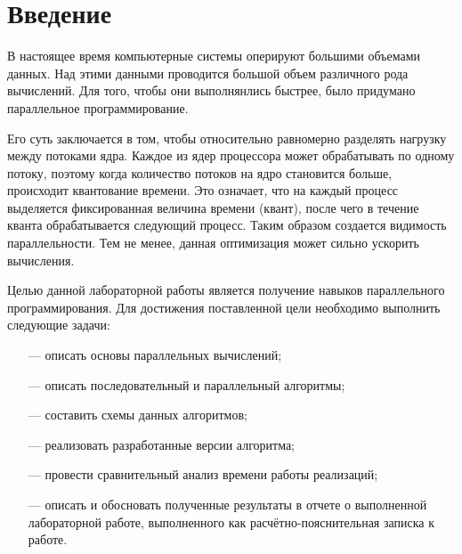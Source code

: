 \chapter*{Введение}

В настоящее время компьютерные системы оперируют большими объемами данных. Над этими данными проводится большой объем различного рода вычислений. Для того, чтобы они выполнянлись быстрее, было придумано параллельное программирование.

Его суть заключается в том, чтобы относительно равномерно разделять нагрузку между потоками ядра. Каждое из ядер процессора может обрабатывать по одному потоку, поэтому когда количество потоков на ядро становится больше, происходит квантование времени. Это означает, что на каждый процесс выделяется фиксированная величина времени (квант), после чего в течение кванта обрабатывается следующий процесс. Таким образом создается видимость параллельности. Тем не менее, данная оптимизация может сильно ускорить вычисления. 

Целью данной лабораторной работы является получение навыков параллельного программирования. Для достижения поставленной цели необходимо выполнить следующие задачи:

\begin{itemize}
	\item[---] описать основы параллельных вычислений;
	\item[---] описать последовательный и параллельный алгоритмы;
	\item[---] составить схемы данных алгоритмов;
    \item[---] реализовать разработанные версии алгоритма;
	\item[---] провести сравнительный анализ времени работы реализаций;
    \item[---] описать и обосновать полученные результаты в отчете о выполненной лабораторной работе, выполненного как расчётно-пояснительная записка к работе.
\end{itemize}